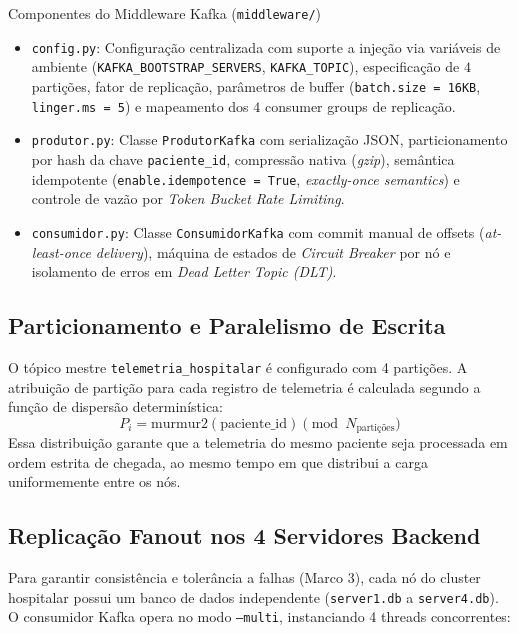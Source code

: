\documentclass[11pt,a4paper]{article}
\begin{document}
\begin{arquitetura}{Componentes do Middleware Kafka (\texttt{middleware/})}
\begin{itemize}
    \item \texttt{config.py}: Configuração centralizada com suporte a injeção via variáveis de ambiente (\texttt{KAFKA\_BOOTSTRAP\_SERVERS}, \texttt{KAFKA\_TOPIC}), especificação de $4$ partições, fator de replicação, parâmetros de buffer (\texttt{batch.size = 16KB}, \texttt{linger.ms = 5}) e mapeamento dos $4$ consumer groups de replicação.
    \item \texttt{produtor.py}: Classe \texttt{ProdutorKafka} com serialização JSON, particionamento por hash da chave \texttt{paciente\_id}, compressão nativa (\textit{gzip}), semântica idempotente (\texttt{enable.idempotence = True}, \textit{exactly-once semantics}) e controle de vazão por \textit{Token Bucket Rate Limiting}.
    \item \texttt{consumidor.py}: Classe \texttt{ConsumidorKafka} com commit manual de offsets (\textit{at-least-once delivery}), máquina de estados de \textit{Circuit Breaker} por nó e isolamento de erros em \textit{Dead Letter Topic (DLT)}.
\end{itemize}
\end{arquitetura}

\subsection{Particionamento e Paralelismo de Escrita}
O tópico mestre \texttt{telemetria\_hospitalar} é configurado com 4 partições. A atribuição de partição para cada registro de telemetria é calculada segundo a função de dispersão determinística:
\begin{equation}
    P_i = \text{murmur2}(\text{paciente\_id}) \pmod{N_{\text{partições}}}
\end{equation}
Essa distribuição garante que a telemetria do mesmo paciente seja processada em ordem estrita de chegada, ao mesmo tempo em que distribui a carga uniformemente entre os nós.

\subsection{Replicação Fanout nos 4 Servidores Backend}
Para garantir consistência e tolerância a falhas (Marco 3), cada nó do cluster hospitalar possui um banco de dados independente (\texttt{server1.db} a \texttt{server4.db}). O consumidor Kafka opera no modo \texttt{--multi}, instanciando 4 threads concorrentes:
\end{document}
